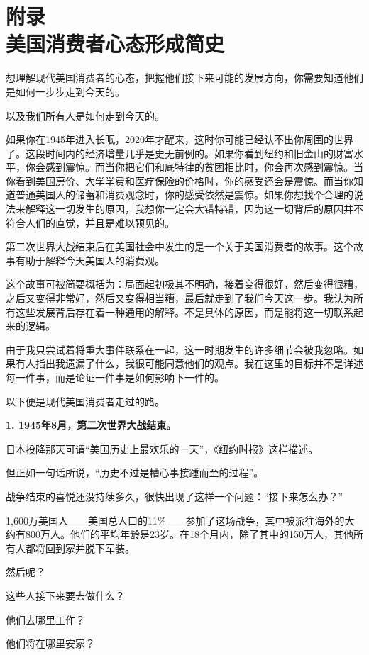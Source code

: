 \BookAppendix

\section[附录\q 美国消费者心态形成简史]{附录\\ 美国消费者心态形成简史}

想理解现代美国消费者的心态，把握他们接下来可能的发展方向，你需要知道他们是如何一步步走到今天的。

以及我们所有人是如何走到今天的。

如果你在1945年进入长眠，2020年才醒来，这时你可能已经认不出你周围的世界了。这段时间内的经济增量几乎是史无前例的。如果你看到纽约和旧金山的财富水平，你会感到震惊。而当你把它们和底特律的贫困相比时，你会再次感到震惊。当你看到美国房价、大学学费和医疗保险的价格时，你的感受还会是震惊。而当你知道普通美国人的储蓄和消费观念时，你的感受依然是震惊。如果你想找个合理的说法来解释这一切发生的原因，我想你一定会大错特错，因为这一切背后的原因并不符合人们的直觉，并且是难以预见的。

第二次世界大战结束后在美国社会中发生的是一个关于美国消费者的故事。这个故事有助于解释今天美国人的消费观。

这个故事可被简要概括为：局面起初极其不明确，接着变得很好，然后变得很糟，之后又变得非常好，然后又变得相当糟，最后就走到了我们今天这一步。我认为所有这些发展背后存在着一种通用的解释。不是具体的原因，而是能将这一切联系起来的逻辑。

由于我只尝试着将重大事件联系在一起，这一时期发生的许多细节会被我忽略。如果有人指出我遗漏了什么，我很可能同意他们的观点。我在这里的目标并不是详述每一件事，而是论证一件事是如何影响下一件的。

以下便是现代美国消费者走过的路。

\textbf{1. 1945年8月，第二次世界大战结束。}

日本投降那天可谓“美国历史上最欢乐的一天”，《纽约时报》这样描述。

但正如一句话所说，“历史不过是糟心事接踵而至的过程”。

战争结束的喜悦还没持续多久，很快出现了这样一个问题：“接下来怎么办？”

1,600万美国人——美国总人口的11\%——参加了这场战争，其中被派往海外的大约有800万人。他们的平均年龄是23岁。在18个月内，除了其中的150万人，其他所有人都将回到家并脱下军装。

然后呢？

这些人接下来要去做什么？

他们去哪里工作？

他们将在哪里安家？


